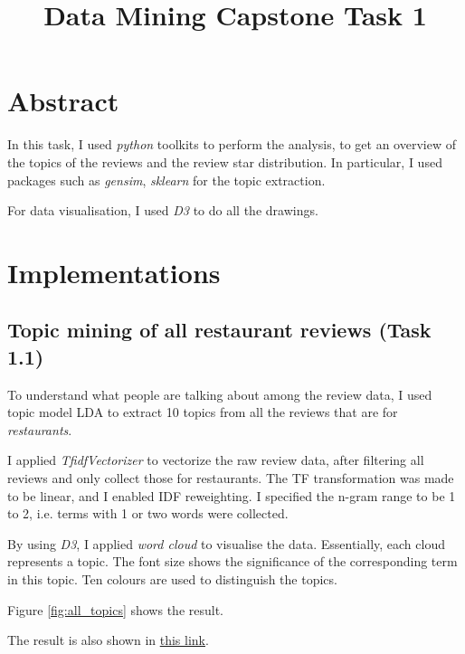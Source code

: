 \documentclass[11pt]{article}
\title{Data Mining Capstone Task 1}
\begin{document}
\maketitle

\section{Abstract}
In this task, I used \emph{python} toolkits to perform the analysis, to get an overview of the topics of the reviews and the review star distribution.
In particular, I used packages such as \emph{gensim}, \emph{sklearn} for the topic extraction.

For data visualisation, I used \emph{D3} to do all the drawings.

\section{Implementations}
\subsection{Topic mining of all restaurant reviews (Task 1.1)}
To understand what people are talking about among the review data, I used topic model LDA to extract 10 topics from all the reviews that are for \emph{restaurants}.

I applied \emph{TfidfVectorizer} to vectorize the raw review data, after filtering all reviews and only collect those for restaurants.
The TF transformation was made to be linear, and I enabled IDF reweighting.
I specified the n-gram range to be 1 to 2, i.e. terms with 1 or two words were collected.

By using \emph{D3}, I applied \emph{word cloud} to visualise the data.
Essentially, each cloud represents a topic. The font size shows the significance of the corresponding term in this topic.
Ten colours are used to distinguish the topics.

Figure \ref{fig:all_topics} shows the result.

The result is also shown in \href{http://jiacheng-pan.me/standalone/datamining_capstone/task1/all_reviews_topics.html}{this link}.
\end{document}
